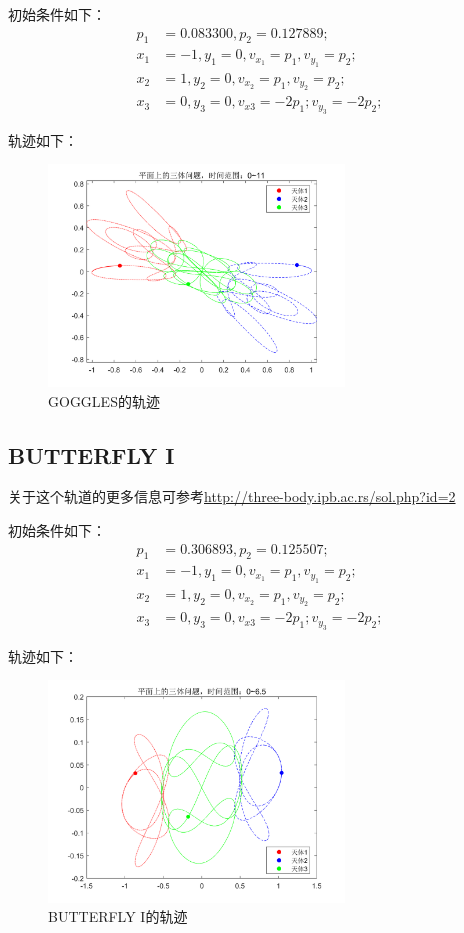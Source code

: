 \documentclass{article}
\begin{document}
\par 初始条件如下：
\begin{align*}
	p_1 &= 0.083300, p_2= 0.127889;\\
	x_1&= -1 , y_1= 0,	v_{x_1}= p_1, v_{y_1}= p_2;\\
	x_2&= 1 , y_2= 0,	v_{x_2}= p_1, v_{y_2}= p_2;\\
	x_3&= 0 ,y_3=0,		v_{x3}= -2p_1; v_{y_3}= -2p_2;
\end{align*}
\par 轨迹如下：
\begin{figure}[H]
	\centering  %
	\includegraphics[width=0.7\textwidth]{一些优美的周期解//GOGGLES}
	\caption{GOGGLES的轨迹}
	\label{GOGGLES}
\end{figure}


\subsection{BUTTERFLY I}
\par
关于这个轨道的更多信息可参考\url{http://three-body.ipb.ac.rs/sol.php?id=2}
\par 初始条件如下：
\begin{align*}
	p_1& = 0.306893, p_2= 0.125507;\\
	x_1&= -1 , y_1= 0,	v_{x_1}= p_1, v_{y_1}= p_2;\\
	x_2&= 1 , y_2= 0,	v_{x_2}= p_1, v_{y_2}= p_2;\\
	x_3&= 0 ,y_3=0,		v_{x3}= -2p_1; v_{y_3}= -2p_2;
\end{align*}
\par 轨迹如下：
\begin{figure}[H]
	\centering  %
	\includegraphics[width=0.7\textwidth]{一些优美的周期解//BUTTERFLY I}
	\caption{BUTTERFLY I的轨迹}
	\label{BUTTERFLY_1}
\end{figure}
\end{document}
